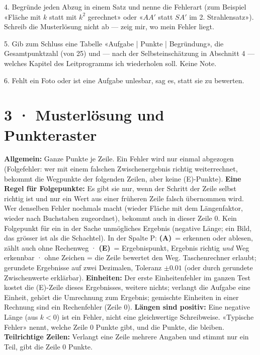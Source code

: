 \documentclass[11pt]{article}
\begin{document}
\begin{tcolorbox}[breakable,colback=lplinie!25,colframe=lplinie,boxrule=0.5pt,arc=1mm,fontupper=\small,left=2mm,right=2mm,top=1.5mm,bottom=1.5mm]
4. Begründe jeden Abzug in einem Satz und nenne die Fehlerart (zum Beispiel «Fläche mit $k$ statt mit $k^2$ gerechnet» oder «$AA'$ statt $SA'$ im 2. Strahlensatz»). Schreib die Musterlösung nicht ab — zeig mir, wo mein Fehler liegt.\par
5. Gib zum Schluss eine Tabelle «Aufgabe | Punkte | Begründung», die Gesamtpunktzahl (von 25) und — nach der Selbsteinschätzung in Abschnitt 4 — welches Kapitel des Leitprogramms ich wiederholen soll. Keine Note.\par
6. Fehlt ein Foto oder ist eine Aufgabe unlesbar, sag es, statt sie zu bewerten.
\end{tcolorbox}

\section*{3 · Musterlösung und Punkteraster}
\textbf{Allgemein:} Ganze Punkte je Zeile. Ein Fehler wird nur einmal abgezogen (Folgefehler: wer mit einem falschen
Zwischenergebnis richtig weiterrechnet, bekommt die Wegpunkte der folgenden Zeilen, aber keine (E)-Punkte). \textbf{Eine Regel
für Folgepunkte:} Es gibt sie nur, wenn der Schritt der Zeile selbst richtig ist und nur ein Wert aus einer früheren Zeile falsch
übernommen wird. Wer denselben Fehler nochmals macht (wieder Fläche mit dem Längenfaktor, wieder nach Buchstaben zugeordnet),
bekommt auch in dieser Zeile 0. Kein Folgepunkt für ein in der Sache unmögliches Ergebnis (negative Länge; ein Bild, das grösser
ist als die Schachtel). In der Spalte P:
\textbf{(A)}~= erkennen oder ablesen, zählt auch ohne Rechenweg · \textbf{(E)}~= Ergebnispunkt, Ergebnis richtig
\emph{und} Weg erkennbar · ohne Zeichen = die Zeile bewertet den Weg. Taschenrechner erlaubt; gerundete Ergebnisse auf zwei
Dezimalen, Toleranz $\pm 0.01$ (oder durch gerundete Zwischenwerte erklärbar). \textbf{Einheiten:} Der erste Einheitenfehler im
ganzen Test kostet die (E)-Zeile dieses Ergebnisses, weitere nichts; verlangt die Aufgabe eine Einheit, gehört die Umrechnung zum
Ergebnis; gemischte Einheiten in einer Rechnung sind ein Rechenfehler (Zeile 0). \textbf{Längen sind positiv:} Eine negative Länge
(aus $k < 0$) ist ein Fehler, nicht eine gleichwertige Schreibweise.
«Typische Fehler» nennt, welche Zeile 0 Punkte gibt, und die Punkte, die bleiben.
\textbf{Teilrichtige Zeilen:} Verlangt eine Zeile mehrere Angaben und stimmt nur ein Teil, gibt die Zeile 0 Punkte.
\end{document}

